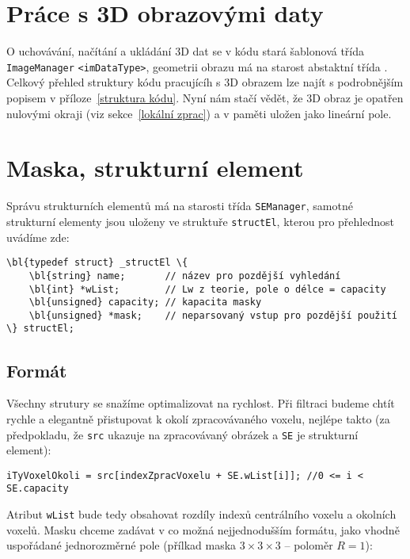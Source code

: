     \section{Práce s 3D obrazovými daty}

    O uchovávání, načítání a ukládání 3D dat se v kódu stará šablonová třída {\tt ImageManager} {\tt <imDataType>}, geometrii obrazu má na starost abstaktní třída \Imageinfo. Celkový přehled struktury kódu pracujícíh s 3D obrazem lze najít s podrobnějším popisem v příloze~\ref{struktura kódu}. Nyní nám stačí vědět, že 3D obraz je opatřen nulovými okraji (viz sekce~\ref{lokální zprac}) a v paměti uložen jako lineární pole.

    \section{Maska, strukturní element}

    Správu strukturních elementů má na starosti třída {\tt SEManager}, samotné strukturní elementy jsou uloženy ve struktuře {\tt structEl}, kterou pro přehlednost uvádíme zde:

    \begin{Verbatim}[commandchars = \\\{\}]
\bl{typedef struct} _structEl \{
    \bl{string} name;       // název pro pozdější vyhledání
    \bl{int} *wList;        // Lw z teorie, pole o délce = capacity
    \bl{unsigned} capacity; // kapacita masky
    \bl{unsigned} *mask;    // neparsovaný vstup pro pozdější použití
\} structEl;
    \end{Verbatim}

    \subsection{Formát}

    Všechny strutury se snažíme optimalizovat na rychlost. Při filtraci budeme chtít rychle a elegantně přistupovat k okolí zpracovávaného voxelu, nejlépe takto (za předpokladu, že {\tt src} ukazuje na zpracovávaný obrázek a {\tt SE} je strukturní element):

    \begin{Verbatim}
iTyVoxelOkoli = src[indexZpracVoxelu + SE.wList[i]]; //0 <= i < SE.capacity
    \end{Verbatim}

    Atribut {\tt wList} bude tedy obsahovat rozdíly indexů centrálního voxelu a okolních voxelů. Masku chceme zadávat v co možná nejjednodušším formátu, jako vhodně uspořádané jednorozměrné pole (přílkad maska $3\times 3\times3$ -- poloměr $R = 1$):

